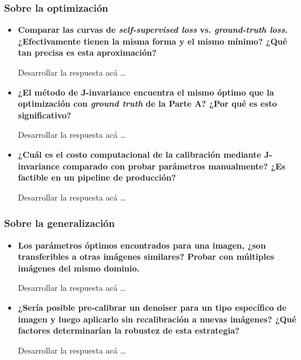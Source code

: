         \subsubsection*{Sobre la optimización}
        \begin{itemize}[leftmargin=*]
            \item \textbf{Comparar las curvas de \textit{self-supervised loss} vs. \textit{ground-truth loss}. ¿Efectivamente tienen la misma forma y el mismo mínimo? ¿Qué tan precisa es esta aproximación?} 
            
                Desarrollar la respuesta acá \dots
            
            \item \textbf{¿El método de J-invariance encuentra el mismo óptimo que la optimización con \textit{ground truth} de la Parte A? ¿Por qué es esto significativo?} 
            
                Desarrollar la respuesta acá \dots
            
            \item \textbf{¿Cuál es el costo computacional de la calibración mediante J-invariance comparado con probar parámetros manualmente? ¿Es factible en un pipeline de producción?} 
            
                Desarrollar la respuesta acá \dots

        \end{itemize}

        \subsubsection*{Sobre la generalización}
        \begin{itemize}[leftmargin=*]
            \item \textbf{Los parámetros óptimos encontrados para una imagen, ¿son transferibles a otras imágenes similares? Probar con múltiples imágenes del mismo dominio.}
            
                Desarrollar la respuesta acá \dots

            \item \textbf{¿Sería posible pre-calibrar un denoiser para un tipo específico de imagen y luego aplicarlo sin recalibración a nuevas imágenes? ¿Qué factores determinarían la robustez de esta estrategia?}
            
                Desarrollar la respuesta acá \dots
                
        \end{itemize}

